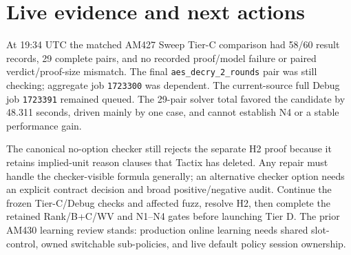 \documentclass[10pt]{article}
\begin{document}
\section*{Live evidence and next actions}
At 19:34 UTC the matched AM427 Sweep Tier-C comparison had 58/60 result
records, 29 complete pairs, and no recorded proof/model failure or paired
verdict/proof-size mismatch. The final \texttt{aes\_decry\_2\_rounds}
pair was still checking; aggregate job \texttt{1723300} was dependent.
The current-source full Debug job \texttt{1723391} remained queued. The
29-pair solver total favored the candidate by 48.311 seconds, driven mainly
by one case, and cannot establish N4 or a stable performance gain.

The canonical no-option checker still rejects the separate H2 proof because
it retains implied-unit reason clauses that Tactix has deleted. Any repair
must handle the checker-visible formula generally; an alternative checker
option needs an explicit contract decision and broad positive/negative
audit. Continue the frozen Tier-C/Debug checks and affected fuzz, resolve H2,
then complete the retained Rank/B+C/WV and N1--N4 gates before launching
Tier D. The prior AM430 learning review stands: production online learning
needs shared slot-control, owned switchable sub-policies, and live default
policy session ownership.
\end{document}
